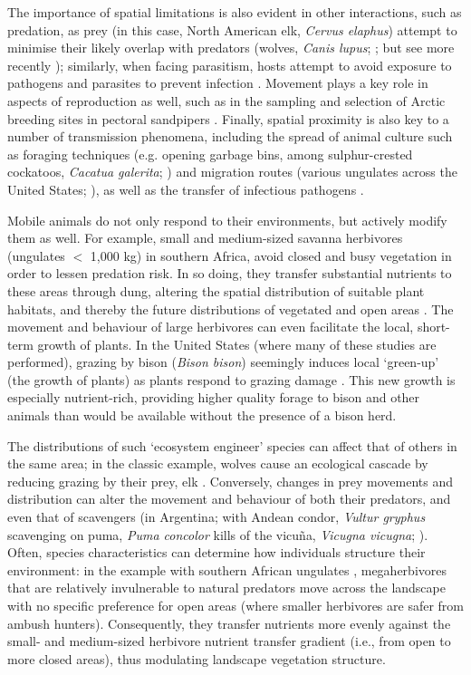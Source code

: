 The importance of spatial limitations is also evident in other interactions, such as predation, as prey (in this case, North American elk, \emph{Cervus elaphus}) attempt to minimise their likely overlap with predators (wolves, \emph{Canis lupus}; \cite{fortin2005}; but see more recently \cite{kohl2018}); similarly, when facing parasitism, hosts attempt to avoid exposure to pathogens and parasites to prevent infection \citep{weinstein2018}.
Movement plays a key role in aspects of reproduction as well, such as in the sampling and selection of Arctic breeding sites in pectoral sandpipers \parencite[\emph{Calidris melanotos};][]{kempenaers2017}.
Finally, spatial proximity is also key to a number of transmission phenomena, including the spread of animal culture such as foraging techniques (e.g. opening garbage bins, among sulphur-crested cockatoos, \emph{Cacatua galerita}; \cite{klump2021}) and migration routes (various ungulates across the United States; \cite{jesmer2018}), as well as the transfer of infectious pathogens \citep[][see also Chapter~\ref{ch:pathomove}]{weinstein2018,monk2022,stroeymeyt2018}.

Mobile animals do not only respond to their environments, but actively modify them as well.
For example, small and medium-sized savanna herbivores (ungulates $<$ 1,000 kg) in southern Africa, avoid closed and busy vegetation in order to lessen predation risk.
In so doing, they transfer substantial nutrients to these areas through dung, altering the spatial distribution of suitable plant habitats, and thereby the future distributions of vegetated and open areas \parencite{leroux2018}.
The movement and behaviour of large herbivores can even facilitate the local, short-term growth of plants.
In the United States (where many of these studies are performed), grazing by bison (\emph{Bison bison}) seemingly induces local `green-up' (the growth of plants) as plants respond to grazing damage \parencite{geremia2019}.
This new growth is especially nutrient-rich, providing higher quality forage to bison and other animals than would be available without the presence of a bison herd.

The distributions of such `ecosystem engineer' species can affect that of others in the same area; in the classic example, wolves cause an ecological cascade by reducing grazing by their prey, elk \parencite{fortin2005}.
Conversely, changes in prey movements and distribution can alter the movement and behaviour of both their predators, and even that of scavengers (in Argentina; with Andean condor, \emph{Vultur gryphus} scavenging on puma, \emph{Puma concolor} kills of the vicu{\~n}a, \emph{Vicugna vicugna}; \cite{monk2022}).
Often, species characteristics can determine how individuals structure their environment: in the example with southern African ungulates \parencite{leroux2018}, megaherbivores that are relatively invulnerable to natural predators move across the landscape with no specific preference for open areas (where smaller herbivores are safer from ambush hunters).
Consequently, they transfer nutrients more evenly against the small- and medium-sized herbivore nutrient transfer gradient (i.e., from open to more closed areas), thus modulating landscape vegetation structure.

